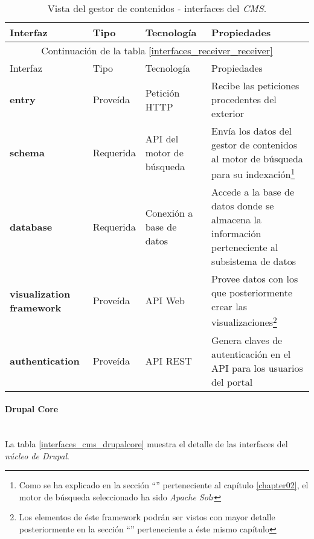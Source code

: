 \begin{longtable}[c]{|p{25mm}|p{20mm}|p{30mm}|p{60mm}|}
 \caption{Vista del gestor de contenidos - interfaces del \textit{CMS}.\label{interfaces_cms_cms}}\\

 \hline
 	Interfaz & Tipo & Tecnología & Propiedades\\
 \hline
 \hline
 \endfirsthead
 \hline
 \multicolumn{4}{|c|}{Continuación de la tabla \ref{interfaces_receiver_receiver}}\\
 \hline
 	Interfaz & Tipo & Tecnología & Propiedades\\
 \hline
 \hline
 \endhead
 \hline
 \endfoot
 
	\textbf{entry} & Proveída & Petición HTTP & Recibe las peticiones procedentes del exterior \\
	\hline
		
	\textbf{schema} & Requerida & API del motor de búsqueda & Envía los datos del gestor de contenidos al motor de búsqueda para su indexación\footnote{ Como se ha explicado en la sección ``\nameref{chapter02:alternativas_seleccionadas}'' perteneciente al capítulo \ref{chapter02}, el motor de búsqueda seleccionado ha sido \textit{Apache Solr}} \\
	\hline
	
	\textbf{database} & Requerida & Conexión a base de datos & Accede a la base de datos donde se almacena la información perteneciente al subsistema de datos \\
	\hline
	
	\textbf{visualization framework} & Proveída & API Web & Provee datos con los que posteriormente crear las visualizaciones\footnote{Los elementos de éste framework podrán ser vistos con mayor detalle posteriormente en la sección ``\nameref{vista_landportal_uris}'' perteneciente a éste mismo capítulo} \\
	\hline
	
	\textbf{authentication} & Proveída & API REST & Genera claves de autenticación en el API para los usuarios del portal \\
\hline
\hline

 \end{longtable}


\paragraph{Drupal Core} \hfill \\
La tabla \ref{interfaces_cms_drupalcore} muestra el detalle de las interfaces del \textit{núcleo de Drupal}.  


